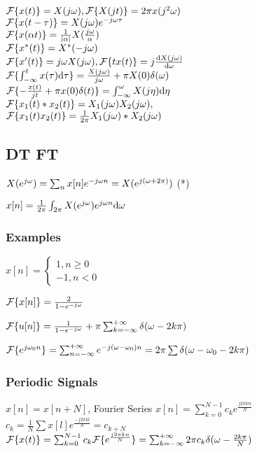 $\mathcal{F}\{x(t)\} = X(j\omega), \mathcal{F}\{X(jt)\} = 2\pi x(j^2\omega)$\\
$\mathcal{F}\{x(t-\tau)\} = X(j\omega) e^{-j\omega\tau}$\\
$\mathcal{F}\{x(\alpha t)\} = \frac{1}{|\alpha|}X(\frac{j\omega}{\alpha})$\\
$\mathcal{F}\{x^*(t)\} = X^*(-j\omega)$\\
$\mathcal{F}\{x'(t)\} = j\omega X(j\omega), \mathcal{F}\{tx(t)\} = j\frac{\mathrm{d} X(j\omega)}{\mathrm{d} \omega}$\\
$\mathcal{F}\{\int_{-\infty}^{t} x(\tau) \mathrm{d} \tau\} = \frac{X(j\omega)}{j\omega} +\pi X(0)\delta(\omega)$\\
$\mathcal{F}\{-\frac{x(t)}{jt} +\pi x(0)\delta(t)\} = \int_{-\infty}^{\omega} X(j\eta) \mathrm{d} \eta$\\
$\mathcal{F}\{x_1(t)*x_2(t)\} = X_1(j\omega) X_2(j\omega),$\\
$\mathcal{F}\{x_1(t)x_2(t)\} = \frac{1}{2\pi}X_1(j\omega) * X_2(j\omega)$
\subsection{DT FT}

$X(e^{j\omega}) = \sum_n x[n] e^{-j\omega n} = X(e^{j(\omega + 2\pi)})$ (*)

$x[n] = \frac{1}{2\pi} \int_{2\pi} X(e^{j\omega}) e^{j\omega n} \mathrm{d} \omega$

\subsubsection*{Examples}

$x[n] = \begin{cases} 1, n\ge 0\\-1, n<0\end{cases}$

$\mathcal{F}\{x[n]\}=\frac{2}{1-e^{-j\omega}}$

$\mathcal{F}\{u[n]\}=\frac{1}{1-e^{-j\omega}} + \pi\sum_{k=-\infty}^{+\infty} \delta(\omega - 2k\pi)$

$\mathcal{F}\{e^{j\omega_0n}\} = \sum_{n=-\infty}^{+\infty} e^{-j(\omega-\omega_0)n} = 2\pi\sum \delta(\omega-\omega_0-2k\pi)$

\subsubsection*{Periodic Signals}

$x[n] = x[n+N]$, Fourier Series $x[n] = \sum_{k=0}^{N-1} c_k e^{\frac{j2\pi k n}{N}}$\\
$c_k = \frac{1}{N} \sum x[l] e^{\frac{-j2\pi k l}{N}} = c_{k + N}$\\
$\mathcal{F}\{x(t)\} = \sum_{k = 0}^{N - 1} c_k\mathcal{F}\{e^{\frac{j2\pi kn}{N}}\}=\sum_{k=-\infty}^{+\infty} 2\pi c_k\delta(\omega-\frac{2k\pi}{N})$

